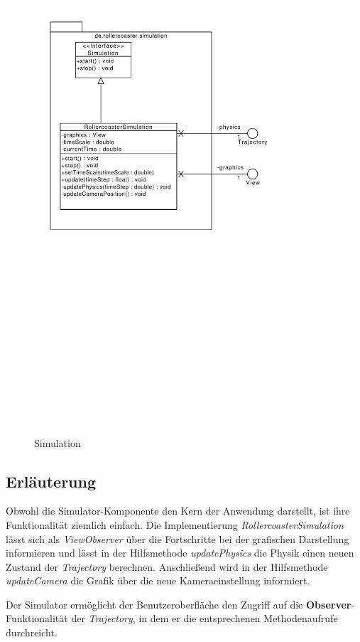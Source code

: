 \begin{figure}
\includegraphics[width=\linewidth]{bilder/Simulation}
\caption{Simulation}
\label{fig:simulation}
\end{figure}

\subsection{Erläuterung}

Obwohl die Simulator-Komponente den Kern der Anwendung darstellt, ist ihre Funktionalität
ziemlich einfach. Die Implementierung \emph{RollercoasterSimulation} lässt sich als
\emph{ViewObserver} über die Fortschritte bei der grafischen Darstellung informieren
und lässt in der Hilfsmethode \emph{updatePhysics} die Physik einen neuen Zustand 
der \emph{Trajectory} berechnen. Anschließend wird in der Hilfsmethode \emph{updateCamera}
die Grafik über die neue Kameraeinstellung informiert.

Der Simulator ermöglicht der Benutzeroberfläche den Zugriff auf die \textbf{Observer}-
Funktionalität der \emph{Trajectory}, in dem er die entsprechenen Methodenaufrufe durchreicht.
